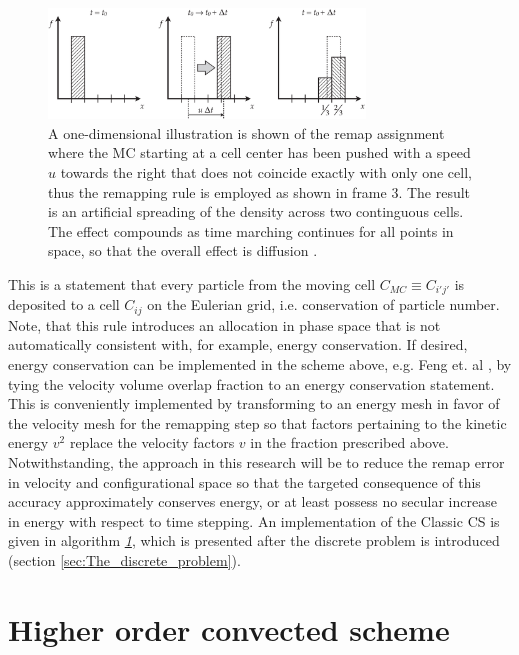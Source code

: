 \documentclass[11pt,titlepage]{report}
\begin{document}
\begin{figure}[h!]
  \centering
    \includegraphics[width=0.75\textwidth]{graphics/ClassicCS_diffusion}
  \caption{A one-dimensional illustration is shown of the remap assignment where the MC starting at a cell center has been pushed with a speed $u$ towards the right that does not coincide exactly with only one cell, thus the remapping rule is employed as shown in frame 3. The result is an artificial spreading of the density across two continguous cells. The effect compounds as time marching continues for all points in space, so that the overall effect is diffusion \cite[p.3293]{Guclu12}.}
  \label{fig:ClassicCS_diffusion}
\end{figure}

This is a statement that every particle from the moving cell $C_{MC} \equiv C_{i'j'}$ is deposited to a cell $C_{ij}$ on the Eulerian grid, i.e. conservation of particle number. Note, that this rule introduces an allocation in phase space that is not automatically consistent with, for example, energy conservation. If desired, energy conservation can be implemented in the scheme above, e.g. Feng et. al \cite{Feng00}, by tying the velocity volume overlap fraction to an energy conservation statement. This is conveniently implemented by transforming to an energy mesh in favor of the velocity mesh for the remapping step so that factors pertaining to the kinetic energy $v^2$ replace the velocity factors $v$ in the fraction prescribed above. Notwithstanding, the approach in this research will be to reduce the remap error in velocity and configurational space so that the targeted consequence of this accuracy approximately conserves energy, or at least possess no secular increase in energy with respect to time stepping. An implementation of the Classic CS is given in algorithm \emph{\hyperlink{alg:1}{1}}, which is presented after the discrete problem is introduced (section \ref{sec:The_discrete_problem}).


\section{Higher order convected scheme}\label{sec:Higher_order_convected_scheme}
\end{document}
